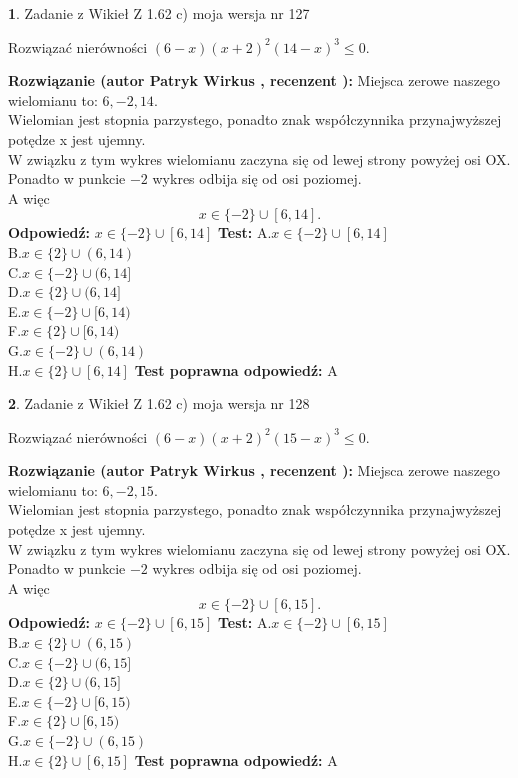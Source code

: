 \documentclass[12pt, a4paper]{article}
\theoremstyle{definition} %
\newtheorem{zad}{}
\newcommand{\zadStart}[1]{\begin{zad}#1\newline}
\newcommand{\zadStop}{\end{zad}}
\newcommand{\rozwStart}[2]{\noindent \textbf{Rozwiązanie (autor #1 , recenzent #2): }\newline}
\newcommand{\rozwStop}{\newline}
\newcommand{\odpStart}{\noindent \textbf{Odpowiedź:}\newline}
\newcommand{\odpStop}{\newline}
\newcommand{\testStart}{\noindent \textbf{Test:}\newline}
\newcommand{\testStop}{\newline}
\newcommand{\kluczStart}{\noindent \textbf{Test poprawna odpowiedź:}\newline}
\newcommand{\kluczStop}{\newline}
\begin{document}
\zadStart{Zadanie z Wikieł Z 1.62 c) moja wersja nr 127}

Rozwiązać nierówności $(6-x)(x+2)^{2}(14-x)^{3}\le0$.
\zadStop
\rozwStart{Patryk Wirkus}{}
Miejsca zerowe naszego wielomianu to: $6, -2, 14$.\\
Wielomian jest stopnia parzystego, ponadto znak współczynnika przy\linebreak najwyższej potędze x jest ujemny.\\ W związku z tym wykres wielomianu zaczyna się od lewej strony powyżej osi OX.\\
Ponadto w punkcie $-2$ wykres odbija się od osi poziomej.\\
A więc $$x \in \{-2\} \cup [6,14].$$
\rozwStop
\odpStart
$x \in \{-2\} \cup [6,14]$
\odpStop
\testStart
A.$x \in \{-2\} \cup [6,14]$\\
B.$x \in \{2\} \cup (6,14)$\\
C.$x \in \{-2\} \cup (6,14]$\\
D.$x \in \{2\} \cup (6,14]$\\
E.$x \in \{-2\} \cup [6,14)$\\
F.$x \in \{2\} \cup [6,14)$\\
G.$x \in \{-2\} \cup (6,14)$\\
H.$x \in \{2\} \cup [6,14]$
\testStop
\kluczStart
A
\kluczStop



\zadStart{Zadanie z Wikieł Z 1.62 c) moja wersja nr 128}

Rozwiązać nierówności $(6-x)(x+2)^{2}(15-x)^{3}\le0$.
\zadStop
\rozwStart{Patryk Wirkus}{}
Miejsca zerowe naszego wielomianu to: $6, -2, 15$.\\
Wielomian jest stopnia parzystego, ponadto znak współczynnika przy\linebreak najwyższej potędze x jest ujemny.\\ W związku z tym wykres wielomianu zaczyna się od lewej strony powyżej osi OX.\\
Ponadto w punkcie $-2$ wykres odbija się od osi poziomej.\\
A więc $$x \in \{-2\} \cup [6,15].$$
\rozwStop
\odpStart
$x \in \{-2\} \cup [6,15]$
\odpStop
\testStart
A.$x \in \{-2\} \cup [6,15]$\\
B.$x \in \{2\} \cup (6,15)$\\
C.$x \in \{-2\} \cup (6,15]$\\
D.$x \in \{2\} \cup (6,15]$\\
E.$x \in \{-2\} \cup [6,15)$\\
F.$x \in \{2\} \cup [6,15)$\\
G.$x \in \{-2\} \cup (6,15)$\\
H.$x \in \{2\} \cup [6,15]$
\testStop
\kluczStart
A
\kluczStop
\end{document}
